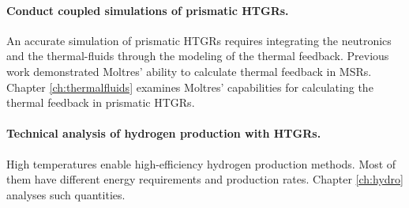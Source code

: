 \paragraph{Conduct coupled simulations of prismatic HTGRs.}
An accurate simulation of prismatic HTGRs requires integrating the neutronics and the thermal-fluids through the modeling of the thermal feedback.
Previous work demonstrated Moltres' ability to calculate thermal feedback in MSRs.
Chapter \ref{ch:thermalfluids} examines Moltres' capabilities for calculating the thermal feedback in prismatic HTGRs.

\paragraph{Technical analysis of hydrogen production with HTGRs.}
High temperatures enable high-efficiency hydrogen production methods.
Most of them have different energy requirements and production rates.
Chapter \ref{ch:hydro} analyses such quantities.
